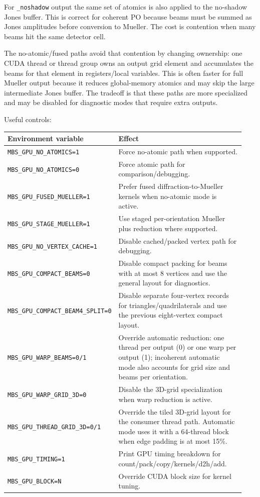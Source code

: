 \documentclass[
  10pt,
  a4paper,
]{article}
\begin{document}
For \texttt{\_noshadow} output the same set of atomics is also applied
to the no-shadow Jones buffer. This is correct for coherent PO because
beams must be summed as Jones amplitudes before conversion to Mueller.
The cost is contention when many beams hit the same detector cell.

The no-atomic/fused paths avoid that contention by changing ownership:
one CUDA thread or thread group owns an output grid element and
accumulates the beams for that element in registers/local variables.
This is often faster for full Mueller output because it reduces
global-memory atomics and may skip the large intermediate Jones buffer.
The tradeoff is that these paths are more specialized and may be
disabled for diagnostic modes that require extra outputs.

Useful controls:

\begin{longtable}[]{@{}L{0.30\linewidth}L{0.64\linewidth}@{}}
\toprule\noalign{}
Environment variable & Effect \\
\midrule\noalign{}
\endhead
\bottomrule\noalign{}
\endlastfoot
\texttt{MBS\_GPU\_NO\_ATOMICS=1} & Force no-atomic path when
supported. \\
\texttt{MBS\_GPU\_NO\_ATOMICS=0} & Force atomic path for
comparison/debugging. \\
\texttt{MBS\_GPU\_FUSED\_MUELLER=1} & Prefer fused
diffraction-to-Mueller kernels when no-atomic mode is active. \\
\texttt{MBS\_GPU\_STAGE\_MUELLER=1} & Use staged per-orientation Mueller
plus reduction where supported. \\
\texttt{MBS\_GPU\_NO\_VERTEX\_CACHE=1} & Disable cached/packed vertex
path for debugging. \\
\texttt{MBS\_GPU\_COMPACT\_BEAMS=0} & Disable compact packing for beams
with at most 8 vertices and use the general layout for diagnostics. \\
\nolinkurl{MBS_GPU_COMPACT_BEAM4_SPLIT=0} & Disable separate four-vertex
records for triangles/quadrilaterals and use the previous eight-vertex
compact layout. \\
\texttt{MBS\_GPU\_WARP\_BEAMS=0/1} & Override automatic reduction: one
thread per output (0) or one warp per output (1); incoherent automatic
mode also accounts for grid size and beams per orientation. \\
\texttt{MBS\_GPU\_WARP\_GRID\_3D=0} & Disable the 3D-grid specialization
when warp reduction is active. \\
\texttt{MBS\_GPU\_THREAD\_GRID\_3D=0/1} & Override the tiled 3D-grid
layout for the consumer thread path. Automatic mode uses it with a
64-thread block when edge padding is at most 15\%. \\
\texttt{MBS\_GPU\_TIMING=1} & Print GPU timing breakdown for
count/pack/copy/kernels/d2h/add. \\
\texttt{MBS\_GPU\_BLOCK=N} & Override CUDA block size for kernel
tuning. \\
\end{longtable}
\end{document}
